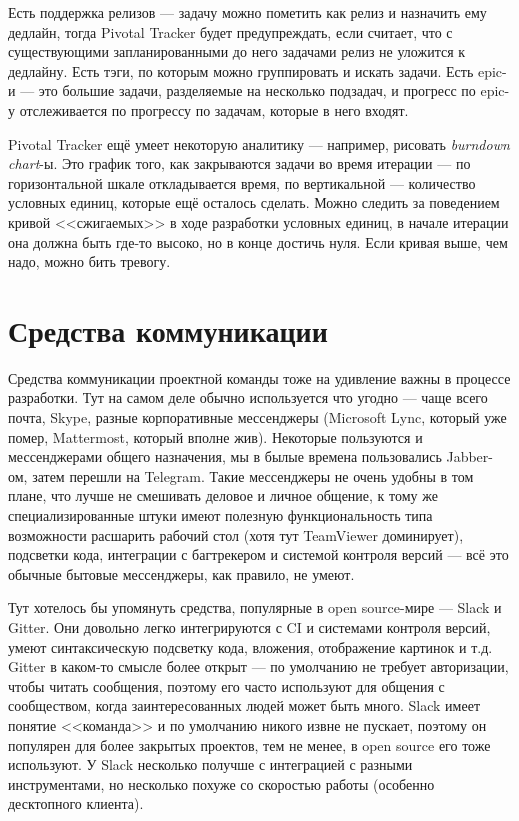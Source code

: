 \documentclass{../../text-style}
\begin{document}
Есть поддержка релизов --- задачу можно пометить как релиз и назначить ему дедлайн, тогда Pivotal Tracker будет предупреждать, если считает, что с существующими запланированными до него задачами релиз не уложится к дедлайну. Есть тэги, по которым можно группировать и искать задачи. Есть epic-и --- это большие задачи, разделяемые на несколько подзадач, и прогресс по epic-у отслеживается по прогрессу по задачам, которые в него входят.

Pivotal Tracker ещё умеет некоторую аналитику --- например, рисовать \textit{burndown chart}-ы. Это график того, как закрываются задачи во время итерации --- по горизонтальной шкале откладывается время, по вертикальной --- количество условных единиц, которые ещё осталось сделать. Можно следить за поведением кривой <<сжигаемых>> в ходе разработки условных единиц, в начале итерации она должна быть где-то высоко, но в конце достичь нуля. Если кривая выше, чем надо, можно бить тревогу.

\section{Средства коммуникации}

Средства коммуникации проектной команды тоже на удивление важны в процессе разработки. Тут на самом деле обычно используется что угодно --- чаще всего почта, Skype, разные корпоративные мессенджеры (Microsoft Lync, который уже помер, Mattermost, который вполне жив). Некоторые пользуются и мессенджерами общего назначения, мы в былые времена пользовались Jabber-ом, затем перешли на Telegram. Такие мессенджеры не очень удобны в том плане, что лучше не смешивать деловое и личное общение, к тому же специализированные штуки имеют полезную функциональность типа возможности расшарить рабочий стол (хотя тут TeamViewer доминирует), подсветки кода, интеграции с багтрекером и системой контроля версий --- всё это обычные бытовые мессенджеры, как правило, не умеют.

Тут хотелось бы упомянуть средства, популярные в open source-мире --- Slack и Gitter. Они довольно легко интегрируются с CI и системами контроля версий, умеют синтаксическую подсветку кода, вложения, отображение картинок и т.д. Gitter в каком-то смысле более открыт --- по умолчанию не требует авторизации, чтобы читать сообщения, поэтому его часто используют для общения с сообществом, когда заинтересованных людей может быть много. Slack имеет понятие <<команда>> и по умолчанию никого извне не пускает, поэтому он популярен для более закрытых проектов, тем не менее, в open source его тоже используют. У Slack несколько получше с интеграцией с разными инструментами, но несколько похуже со скоростью работы (особенно десктопного клиента).
\end{document}
